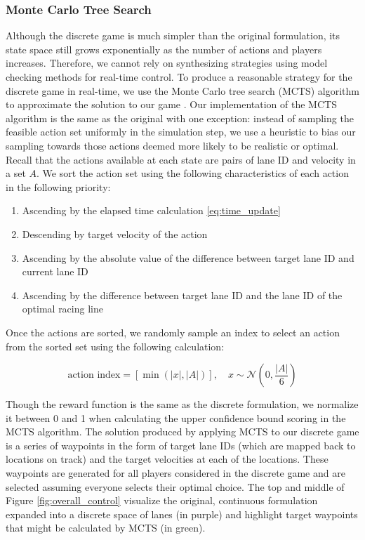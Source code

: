 \subsubsection{Monte Carlo Tree Search}
Although the discrete game is much simpler than the original formulation, its state space still grows exponentially as the number of actions and players increases. Therefore, we cannot rely on synthesizing strategies using model checking methods for real-time control. To produce a reasonable strategy for the discrete game in real-time, we use the Monte Carlo tree search (MCTS) algorithm to approximate the solution to our game \cite{mcts}. Our implementation of the MCTS algorithm is the same as the original with one exception: instead of sampling the feasible action set uniformly in the simulation step, we use a heuristic to bias our sampling towards those actions deemed more likely to be realistic or optimal. Recall that the actions available at each state are pairs of lane ID and velocity in a set $A$. We sort the action set using the following characteristics of each action in the following priority:
\begin{enumerate}
    \item Ascending by the elapsed time calculation \eqref{eq:time_update}
    \item Descending by target velocity of the action
    \item Ascending by the absolute value of the difference between target lane ID and current lane ID
    \item Ascending by the difference between target lane ID and the lane ID of the optimal racing line
\end{enumerate}
Once the actions are sorted, we randomly sample an index to select an action from the sorted set using the following calculation:

\begin{equation}
    \text{action index} = [\min(|x|, |A|)], \quad
     x \sim \mathcal{N}(0, \frac{|A|}{6})
\end{equation}

Though the reward function is the same as the discrete formulation, we normalize it between 0 and 1 when calculating the upper confidence bound scoring in the MCTS algorithm. The solution produced by applying MCTS to our discrete game is a series of waypoints in the form of target lane IDs (which are mapped back to locations on track) and the target velocities at each of the locations. These waypoints are generated for all players considered in the discrete game and are selected assuming everyone selects their optimal choice. The top and middle of Figure \ref{fig:overall_control} visualize the original, continuous formulation expanded into a discrete space of lanes (in purple) and highlight target waypoints that might be calculated by MCTS (in green).  


